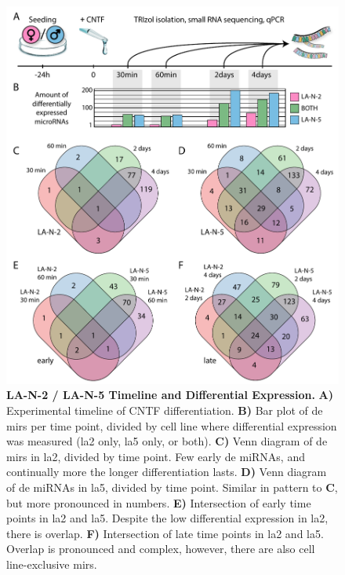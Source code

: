 \begin{figure} 
\includegraphics[width=\textwidth]{figures/timepoints-expr-venn}
\caption[LA-N-2 / LA-N-5 Timeline and Differential Expression.]{\textbf{LA-N-2 / LA-N-5 Timeline and Differential Expression.} \textbf{A)} Experimental timeline of CNTF differentiation. \textbf{B)} Bar plot of \acf{de} \acp{mir} per time point, divided by cell line where differential expression was measured (\ac{la2} only, \ac{la5} only, or both). \textbf{C)} Venn diagram of \ac{de} \acp{mir} in \ac{la2}, divided by time point. Few early \ac{de} miRNAs, and continually more the longer differentiation lasts. \textbf{D)} Venn diagram of \ac{de} miRNAs in \ac{la5}, divided by time point. Similar in pattern to \textbf{C}, but more pronounced in numbers. \textbf{E)} Intersection of early time points in \ac{la2} and \ac{la5}. Despite the low differential expression in \ac{la2}, there is overlap. \textbf{F)} Intersection of late time points in \ac{la2} and \ac{la5}. Overlap is pronounced and complex, however, there are also cell line-exclusive \acp{mir}.
\label{fig:timepoints-expr-venn}}
\end{figure}

